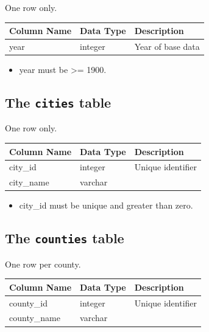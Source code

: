 One row only.


\begin{tabular}{|l|l|l|}
\hline
\textbf{Column Name} & \textbf{Data Type} & \textbf{Description} \\
\hline
year & integer & Year of base data  \\
\hline

\end{tabular}

\begin{itemize} \tight
\item year must be \textgreater{}= 1900.

\end{itemize}

\subsection{The {\tt cities} table}


One row only.


\begin{tabular}{|l|l|l|}
\hline
\textbf{Column Name} & \textbf{Data Type} & \textbf{Description} \\
\hline
city_id & integer & Unique identifier  \\
\hline
city_name & varchar & \\
\hline

\end{tabular}

\begin{itemize} \tight
\item city_id must be unique and greater than zero.

\end{itemize}

\subsection{The {\tt counties} table}


One row per county.


\begin{tabular}{|l|l|l|}
\hline
\textbf{Column Name} & \textbf{Data Type} & \textbf{Description} \\
\hline
county_id & integer & Unique identifier  \\
\hline
county_name & varchar & \\
\hline

\end{tabular}

